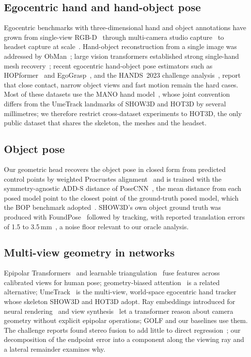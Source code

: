 \subsection{Egocentric hand and hand-object pose}
Egocentric benchmarks with three-dimensional hand and object annotations have grown from single-view RGB-D~\cite{garcia2018fpha} through multi-camera studio capture~\cite{hampali2020honnotate,chao2021dexycb,kwon2021h2o,liu2022hoi4d} to headset capture at scale~\cite{ohkawa2023assemblyhands,banerjee2025hot3d,grauman2024egoexo4d,rim2026show3d}. Hand-object reconstruction from a single image was addressed by ObMan~\cite{hasson2019obman}; large vision transformers established strong single-hand mesh recovery~\cite{pavlakos2024hamer}; recent egocentric hand-object pose estimators such as HOPformer~\cite{bansal2026hopformer} and EgoGrasp~\cite{fu2026egograsp}, and the HANDS~2023 challenge analysis~\cite{fan2024benchmarks}, report that close contact, narrow object views and fast motion remain the hard cases. Most of these datasets use the MANO hand model~\cite{romero2017embodied}, whose joint convention differs from the UmeTrack landmarks of SHOW3D and HOT3D by several millimetres; we therefore restrict cross-dataset experiments to HOT3D, the only public dataset that shares the skeleton, the meshes and the headset.

\subsection{Object pose}
Our geometric head recovers the object pose in closed form from predicted control points by weighted Procrustes alignment~\cite{kabsch1976solution,arun1987least,umeyama1991least} and is trained with the symmetry-agnostic ADD-S distance of PoseCNN~\cite{xiang2018posecnn}, the mean distance from each posed model point to the closest point of the ground-truth posed model, which the BOP benchmark adopted~\cite{hodan2020bop}. SHOW3D's own object ground truth was produced with FoundPose~\cite{ornek2024foundpose} followed by tracking, with reported translation errors of 1.5 to 3.5\,mm~\cite{rim2026show3d}, a noise floor relevant to our oracle analysis.

\subsection{Multi-view geometry in networks}
Epipolar Transformers~\cite{he2020epipolar} and learnable triangulation~\cite{iskakov2019learnable} fuse features across calibrated views for human pose; geometry-biased attention~\cite{moliner2024geometry} is a related alternative; UmeTrack~\cite{han2022umetrack} is the multi-view, world-space egocentric hand tracker whose skeleton SHOW3D and HOT3D adopt. Ray embeddings introduced for neural rendering~\cite{sitzmann2021lfn} and view synthesis~\cite{jin2025lvsm} let a transformer reason about camera geometry without explicit epipolar operations; GOLF and our baselines use them. The challenge reports found stereo fusion to add little to direct regression~\cite{zou2026golf,jin2026jssr}; our decomposition of the endpoint error into a component along the viewing ray and a lateral remainder examines why.

